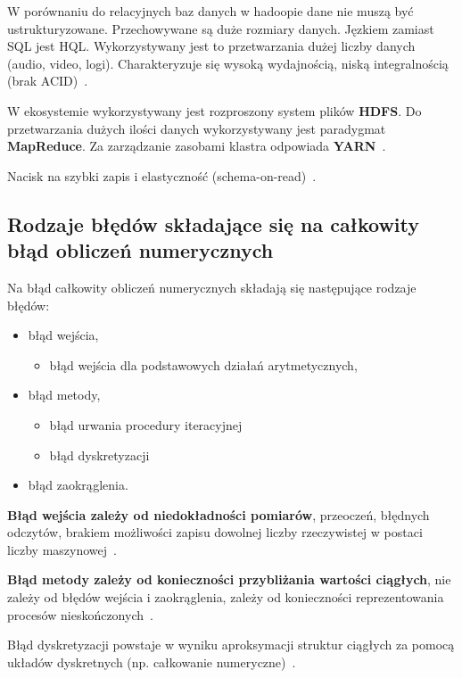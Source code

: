 \documentclass[wi]{zut}
\begin{document}
W porównaniu do relacyjnych baz danych w hadoopie dane nie muszą być ustrukturyzowane. Przechowywane są duże rozmiary danych. Jęzkiem zamiast SQL jest HQL. Wykorzystywany jest to przetwarzania dużej liczby danych (audio, video, logi). Charakteryzuje się wysoką wydajnością, niską integralnością (brak ACID)~\cite{Korytkowski_hadoop}.

W ekosystemie wykorzystywany jest rozproszony system plików \textbf{HDFS}. Do przetwarzania dużych ilości danych wykorzystywany jest paradygmat \textbf{MapReduce}. Za zarządzanie zasobami klastra odpowiada \textbf{YARN}~\cite{Korytkowski_hadoop}.

Nacisk na szybki zapis i elastyczność (schema-on-read)~\cite{Korytkowski_hadoop}.

\subsection{Rodzaje błędów składające się na całkowity błąd obliczeń numerycznych}
Na błąd całkowity obliczeń numerycznych składają się następujące rodzaje błędów:
\begin{itemize}
    \item błąd wejścia,
    \begin{itemize}
        \item błąd wejścia dla podstawowych działań arytmetycznych, 
    \end{itemize}
    \item błąd metody,
    \begin{itemize}
        \item błąd urwania procedury iteracyjnej
        \item błąd dyskretyzacji
    \end{itemize}
    \item błąd zaokrąglenia.
\end{itemize}

\textbf{Błąd wejścia zależy od niedokładności pomiarów}, przeoczeń, błędnych odczytów, brakiem możliwości zapisu dowolnej liczby rzeczywistej w postaci liczby maszynowej~\cite{Piela_Wstep}.

\textbf{Błąd metody zależy od konieczności przybliżania wartości ciągłych}, nie zależy od błędów wejścia i zaokrąglenia, zależy od konieczności reprezentowania procesów nieskończonych~\cite{Piela_Wstep}.

Błąd dyskretyzacji powstaje w wyniku aproksymacji struktur ciągłych za pomocą układów dyskretnych (np. całkowanie numeryczne)~\cite{Piela_Wstep}.
\end{document}
